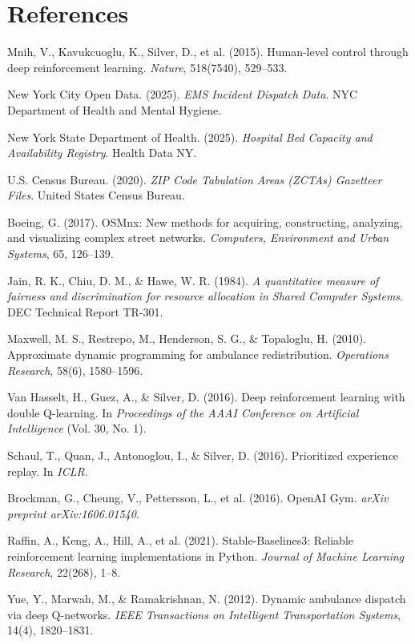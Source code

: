 \documentclass[11pt,a4paper]{article}
\begin{document}
\section*{References}

\begin{enumerate}[label={[\arabic*]}, leftmargin=*]
    \item Mnih, V., Kavukcuoglu, K., Silver, D., et al. (2015). Human-level control through deep reinforcement learning. \emph{Nature}, 518(7540), 529--533.
    \item New York City Open Data. (2025). \emph{EMS Incident Dispatch Data}. NYC Department of Health and Mental Hygiene.
    \item New York State Department of Health. (2025). \emph{Hospital Bed Capacity and Availability Registry}. Health Data NY.
    \item U.S. Census Bureau. (2020). \emph{ZIP Code Tabulation Areas (ZCTAs) Gazetteer Files}. United States Census Bureau.
    \item Boeing, G. (2017). OSMnx: New methods for acquiring, constructing, analyzing, and visualizing complex street networks. \emph{Computers, Environment and Urban Systems}, 65, 126--139.
    \item Jain, R. K., Chiu, D. M., \& Hawe, W. R. (1984). \emph{A quantitative measure of fairness and discrimination for resource allocation in Shared Computer Systems}. DEC Technical Report TR-301.
    \item Maxwell, M. S., Restrepo, M., Henderson, S. G., \& Topaloglu, H. (2010). Approximate dynamic programming for ambulance redistribution. \emph{Operations Research}, 58(6), 1580--1596.
    \item Van Hasselt, H., Guez, A., \& Silver, D. (2016). Deep reinforcement learning with double Q-learning. In \emph{Proceedings of the AAAI Conference on Artificial Intelligence} (Vol. 30, No. 1).
    \item Schaul, T., Quan, J., Antonoglou, I., \& Silver, D. (2016). Prioritized experience replay. In \emph{ICLR}.
    \item Brockman, G., Cheung, V., Pettersson, L., et al. (2016). OpenAI Gym. \emph{arXiv preprint arXiv:1606.01540}.
    \item Raffin, A., Keng, A., Hill, A., et al. (2021). Stable-Baselines3: Reliable reinforcement learning implementations in Python. \emph{Journal of Machine Learning Research}, 22(268), 1--8.
    \item Yue, Y., Marwah, M., \& Ramakrishnan, N. (2012). Dynamic ambulance dispatch via deep Q-networks. \emph{IEEE Transactions on Intelligent Transportation Systems}, 14(4), 1820--1831.

\end{enumerate}
\end{document}
